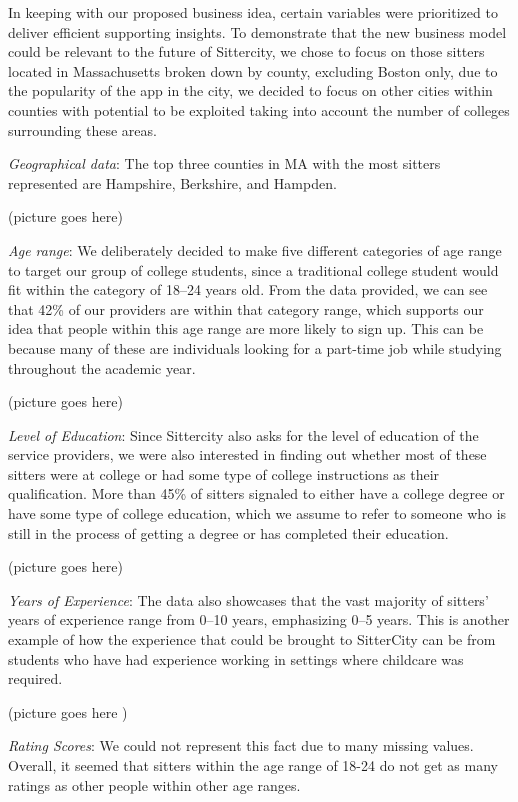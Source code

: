 \documentclass[12pt]{article}
\begin{document}
In keeping with our proposed business idea, certain variables were
prioritized to deliver efficient supporting insights. To demonstrate
that the new business model could be relevant to the future of
Sittercity, we chose to focus on those sitters located in Massachusetts
broken down by county, excluding Boston only, due to the popularity of
the app in the city, we decided to focus on other cities within counties
with potential to be exploited taking into account the number of
colleges surrounding these areas.

\emph{Geographical data}: The top three counties in MA with the most
sitters represented are Hampshire, Berkshire, and Hampden.

(picture goes here)

\emph{Age range}: We deliberately decided to make five different
categories of age range to target our group of college students, since a
traditional college student would fit within the category of 18--24
years old. From the data provided, we can see that 42\% of our providers
are within that category range, which supports our idea that people
within this age range are more likely to sign up. This can be because
many of these are individuals looking for a part-time job while studying
throughout the academic year.

(picture goes here)

\emph{Level of Education}: Since Sittercity also asks for the level of
education of the service providers, we were also interested in finding
out whether most of these sitters were at college or had some type of
college instructions as their qualification. More than 45\% of sitters
signaled to either have a college degree or have some type of college
education, which we assume to refer to someone who is still in the
process of getting a degree or has completed their education.

(picture goes here)

\emph{Years of Experience}: The data also showcases that the vast
majority of sitters' years of experience range from 0--10 years,
emphasizing 0--5 years. This is another example of how the experience
that could be brought to SitterCity can be from students who have had
experience working in settings where childcare was required.

(picture goes here )

\emph{Rating Scores}: We could not represent this fact due to many
missing values. Overall, it seemed that sitters within the age range of
18-24 do not get as many ratings as other people within other age
ranges.
\end{document}

